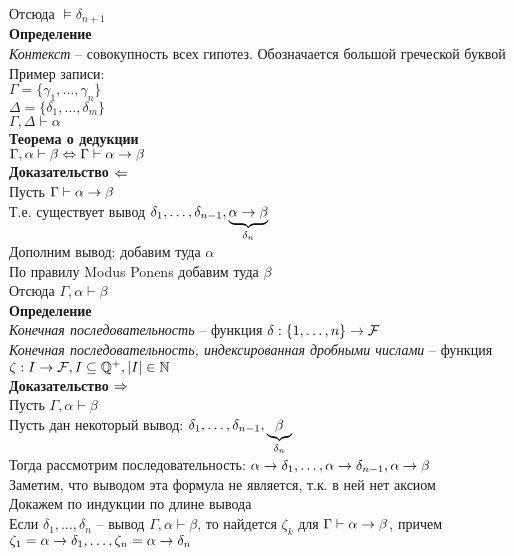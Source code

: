\documentclass[12pt]{article}
\begin{document}
Отсюда $\models \delta_{n+1}$\\
\textbf{Определение}\\
\textit{Контекст} -- совокупность всех гипотез. Обозначается большой греческой буквой\\
Пример записи:\\
$\Gamma = \{ \gamma_1,\ldots, \gamma_n\}$\\
$\Delta = \{ \delta_1,\ldots, \delta_m \}$\\
$\Gamma,\Delta \vdash \alpha$\\
\textbf{Теорема о дедукции}\\
$\Gamma, \alpha \vdash \beta \Leftrightarrow \Gamma\vdash \alpha \rightarrow \beta$\\
\textbf{Доказательство $\Leftarrow$}\\
Пусть $\Gamma\vdash \alpha \rightarrow \beta$\\
Т.е. существует вывод $\delta_1,\ldots, \delta_{n-1}, \underbrace{\alpha \rightarrow \beta}_{\delta_n}$\\
Дополним вывод: добавим туда $\alpha$\\
По правилу Modus Ponens добавим туда $\beta$\\
Отсюда $\Gamma, \alpha \vdash \beta$\\
\textbf{Определение}\\
\textit{Конечная последовательность} -- функция $\delta: \{1,\ldots, n\} \rightarrow \mathcal F$\\
\textit{Конечная последовательность, индексированная дробными числами} -- функция $\zeta: I \rightarrow \mathcal F, I\subseteq \mathbb{Q}^+, |I|\in \mathbb{N}$\\
\textbf{Доказательство $\Rightarrow$}\\
Пусть $\Gamma, \alpha \vdash \beta$\\
Пусть дан некоторый вывод: $\delta_1, \ldots, \delta_{n-1}, \underbrace{\beta}_{\delta_n}$\\
Тогда рассмотрим последовательность: $\alpha \rightarrow \delta_1, \ldots, \alpha \rightarrow \delta_{n-1}, \alpha \rightarrow \beta$\\
Заметим, что выводом эта формула не является, т.к. в ней нет аксиом\\
Докажем по индукции по длине вывода\\
Если $\delta_1, \ldots, \delta_n$ -- вывод $\Gamma,\alpha\vdash \beta$, то найдется $\zeta_k$ для $\Gamma\vdash \alpha\rightarrow \beta$, причем $\zeta_1 =\alpha\rightarrow \delta_1, \ldots, \zeta_n=\alpha\rightarrow \delta_n$
\end{document}
